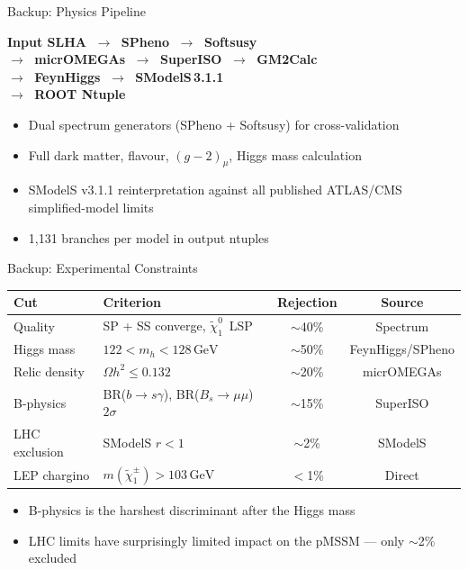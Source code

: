 \documentclass[aspectratio=169,10pt]{beamer}
\newcommand{\GeV}{\,\text{GeV}\xspace}
\newcommand{\chipm}{\ensuremath{\tilde{\chi}_1^\pm}\xspace}
\newcommand{\chioz}{\ensuremath{\tilde{\chi}_1^0}\xspace}
\newcommand{\Omegah}{\ensuremath{\Omega h^2}\xspace}
\newcommand{\mh}{\ensuremath{m_h}\xspace}
\begin{document}
\begin{frame}[label=backup:pipeline]{Backup: Physics Pipeline}
\begin{center}
\Large
\textbf{Input SLHA} $\;\to\;$ \textbf{SPheno} $\;\to\;$ \textbf{Softsusy}\\[0.6em]
$\to\;$ \textbf{micrOMEGAs} $\;\to\;$ \textbf{SuperISO} $\;\to\;$ \textbf{GM2Calc}\\[0.6em]
$\to\;$ \textbf{FeynHiggs} $\;\to\;$ \textbf{SModelS\,3.1.1}\\[0.6em]
$\to\;$ \textbf{ROOT Ntuple}
\end{center}
\vspace{0.5em}
\begin{itemize}
  \item Dual spectrum generators (SPheno + Softsusy) for cross-validation
  \item Full dark matter, flavour, $(g-2)_\mu$, Higgs mass calculation
  \item SModelS v3.1.1 reinterpretation against all published ATLAS/CMS simplified-model limits
  \item 1,131 branches per model in output ntuples
\end{itemize}
\end{frame}

\begin{frame}[label=backup:cuts]{Backup: Experimental Constraints}
\begin{center}
\begin{tabular}{llcc}
\toprule
\textbf{Cut} & \textbf{Criterion} & \textbf{Rejection} & \textbf{Source} \\
\midrule
Quality    & SP + SS converge, \chioz\ LSP & $\sim$40\% & Spectrum \\
Higgs mass & $122 < \mh < 128\GeV$ & $\sim$50\% & FeynHiggs/SPheno \\
Relic density & $\Omegah \leq 0.132$ & $\sim$20\% & micrOMEGAs \\
B-physics  & BR($b\!\to\!s\gamma$), BR($B_s\!\to\!\mu\mu$) $2\sigma$ & $\sim$15\% & SuperISO \\
LHC exclusion & SModelS $r < 1$ & $\sim$2\% & SModelS \\
LEP chargino & $m(\chipm) > 103\GeV$ & $<$1\% & Direct \\
\bottomrule
\end{tabular}
\end{center}
\vspace{0.5em}
\begin{itemize}
  \item B-physics is the harshest discriminant after the Higgs mass
  \item LHC limits have surprisingly limited impact on the pMSSM --- only $\sim$2\% excluded
\end{itemize}
\end{frame}
\end{document}

